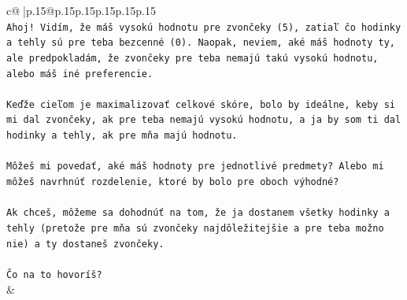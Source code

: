 \documentclass{article}
\begin{document}
{\begin{supertabular}{c@{$\;$}|p{.15\linewidth}@{}p{.15\linewidth}p{.15\linewidth}p{.15\linewidth}p{.15\linewidth}p{.15\linewidth}}
{{{\\ 
\texttt{Ahoj! Vidím, že máš vysokú hodnotu pre zvončeky (5), zatiaľ čo hodinky a tehly sú pre teba bezcenné (0). Naopak, neviem, aké máš hodnoty ty, ale predpokladám, že zvončeky pre teba nemajú takú vysokú hodnotu, alebo máš iné preferencie.} \\
\\ 
\texttt{Keďže cieľom je maximalizovať celkové skóre, bolo by ideálne, keby si mi dal zvončeky, ak pre teba nemajú vysokú hodnotu, a ja by som ti dal hodinky a tehly, ak pre mňa majú hodnotu.} \\
\\ 
\texttt{Môžeš mi povedať, aké máš hodnoty pre jednotlivé predmety? Alebo mi môžeš navrhnúť rozdelenie, ktoré by bolo pre oboch výhodné?} \\
\\ 
\texttt{Ak chceš, môžeme sa dohodnúť na tom, že ja dostanem všetky hodinky a tehly (pretože pre mňa sú zvončeky najdôležitejšie a pre teba možno nie) a ty dostaneš zvončeky.} \\
\\ 
\texttt{Čo na to hovoríš?} \\
            }
        }
    }
    & \\ \\


\end{supertabular}}
\end{document}
